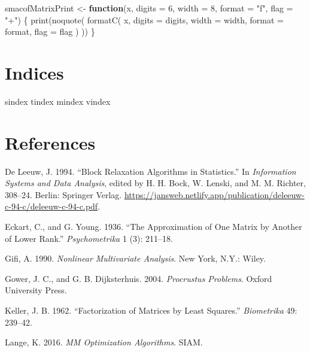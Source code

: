 \documentclass[
  12pt,
  letterpaper,
  DIV=11,
  numbers=noendperiod]{scrartcl}
\newenvironment{Shaded}{\begin{snugshade}}{\end{snugshade}}
\newcommand{\AttributeTok}[1]{\textcolor[rgb]{0.40,0.45,0.13}{#1}}
\newcommand{\ControlFlowTok}[1]{\textcolor[rgb]{0.00,0.23,0.31}{\textbf{#1}}}
\newcommand{\DecValTok}[1]{\textcolor[rgb]{0.68,0.00,0.00}{#1}}
\newcommand{\FunctionTok}[1]{\textcolor[rgb]{0.28,0.35,0.67}{#1}}
\newcommand{\NormalTok}[1]{\textcolor[rgb]{0.00,0.23,0.31}{#1}}
\newcommand{\OtherTok}[1]{\textcolor[rgb]{0.00,0.23,0.31}{#1}}
\newcommand{\StringTok}[1]{\textcolor[rgb]{0.13,0.47,0.30}{#1}}
\newlength{\cslhangindent}
\newenvironment{CSLReferences}[2] %
 {\begin{list}{}{%
  \setlength{\itemindent}{0pt}
  \setlength{\leftmargin}{0pt}
  \setlength{\parsep}{0pt}
  \ifodd #1
   \setlength{\leftmargin}{\cslhangindent}
   \setlength{\itemindent}{-1\cslhangindent}
  \fi
  \setlength{\itemsep}{#2\baselineskip}}}
 {\end{list}}
\newcommand{\sectionbreak}{\clearpage}
\begin{document}
\begin{Shaded}
\begin{Highlighting}[]
\NormalTok{smacofMatrixPrint }\OtherTok{\textless{}{-}} \ControlFlowTok{function}\NormalTok{(x,}
                   \AttributeTok{digits =} \DecValTok{6}\NormalTok{,}
                   \AttributeTok{width =} \DecValTok{8}\NormalTok{,}
                   \AttributeTok{format =} \StringTok{"f"}\NormalTok{,}
                   \AttributeTok{flag =} \StringTok{"+"}\NormalTok{) \{}
  \FunctionTok{print}\NormalTok{(}\FunctionTok{noquote}\NormalTok{(}
    \FunctionTok{formatC}\NormalTok{(}
\NormalTok{      x,}
      \AttributeTok{digits =}\NormalTok{ digits,}
      \AttributeTok{width =}\NormalTok{ width,}
      \AttributeTok{format =}\NormalTok{ format,}
      \AttributeTok{flag =}\NormalTok{ flag}
\NormalTok{    )}
\NormalTok{  ))}
\NormalTok{\}}
\end{Highlighting}
\end{Shaded}

\section{Indices}\label{indices}

sindex tindex mindex vindex

\sectionbreak

\section*{References}\label{references}

\label{refs}
\begin{CSLReferences}{1}{0}
De Leeuw, J. 1994. {``{Block Relaxation Algorithms in Statistics}.''} In
\emph{Information Systems and Data Analysis}, edited by H. H. Bock, W.
Lenski, and M. M. Richter, 308--24. Berlin: Springer Verlag.
\url{https://jansweb.netlify.app/publication/deleeuw-c-94-c/deleeuw-c-94-c.pdf}.

Eckart, C., and G. Young. 1936. {``{The Approximation of One Matrix by
Another of Lower Rank}.''} \emph{Psychometrika} 1 (3): 211--18.

Gifi, A. 1990. \emph{Nonlinear Multivariate Analysis}. New York, N.Y.:
Wiley.

Gower, J. C., and G. B. Dijksterhuis. 2004. \emph{Procrustus Problems}.
Oxford University Press.

Keller, J. B. 1962. {``{Factorization of Matrices by Least Squares}.''}
\emph{Biometrika} 49: 239--42.

Lange, K. 2016. \emph{MM Optimization Algorithms}. SIAM.

\end{CSLReferences}
\end{document}
